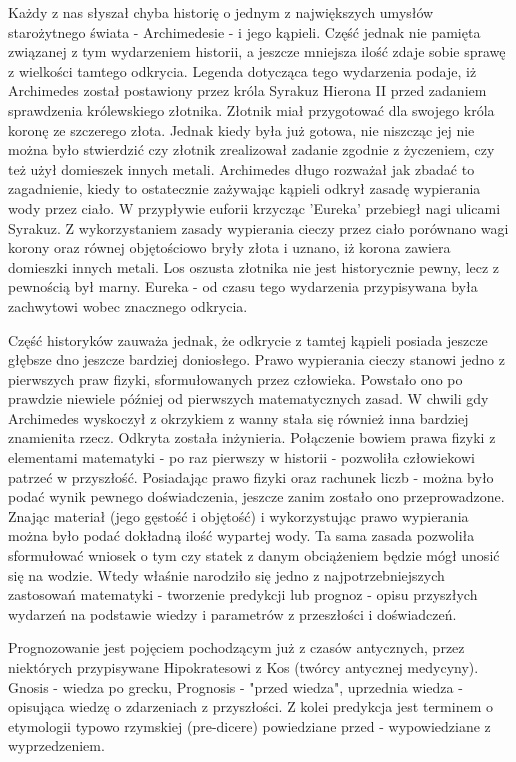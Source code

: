 \documentclass[10pt,a4paper]{book}
\begin{document}
Każdy z nas słyszał chyba historię o jednym z największych umysłów starożytnego świata - Archimedesie - i jego kąpieli. Część jednak nie pamięta związanej z tym wydarzeniem historii, a jeszcze mniejsza ilość zdaje sobie sprawę z wielkości tamtego odkrycia. Legenda dotycząca tego wydarzenia podaje, iż Archimedes został postawiony przez króla Syrakuz Hierona II przed zadaniem sprawdzenia królewskiego złotnika. Złotnik miał przygotować dla swojego króla koronę ze szczerego złota. Jednak kiedy była już gotowa, nie niszcząc jej nie można było stwierdzić czy złotnik zrealizował zadanie zgodnie z życzeniem, czy też użył domieszek innych metali. Archimedes długo rozważał jak zbadać to zagadnienie, kiedy to ostatecznie zażywając kąpieli odkrył zasadę wypierania wody przez ciało. W przypływie euforii krzycząc 'Eureka' przebiegł nagi ulicami Syrakuz. Z wykorzystaniem zasady wypierania cieczy przez ciało porównano wagi korony oraz równej objętościowo bryły złota i uznano, iż korona zawiera domieszki innych metali. Los oszusta złotnika nie jest historycznie pewny, lecz z pewnością był marny. Eureka - od czasu tego wydarzenia przypisywana była zachwytowi wobec znacznego odkrycia. 

Część historyków\citep{netz2007kodeks} zauważa jednak, że odkrycie z tamtej kąpieli posiada jeszcze głębsze dno jeszcze bardziej doniosłego. Prawo wypierania cieczy stanowi jedno z pierwszych praw fizyki, sformułowanych przez człowieka. Powstało ono po prawdzie niewiele później od pierwszych matematycznych zasad. W chwili gdy Archimedes wyskoczył z okrzykiem z wanny stała się również inna bardziej znamienita rzecz. Odkryta została inżynieria. Połączenie bowiem prawa fizyki z elementami matematyki - po raz pierwszy w historii - pozwoliła człowiekowi patrzeć w przyszłość. Posiadając prawo fizyki oraz rachunek liczb - można było podać wynik pewnego doświadczenia, jeszcze zanim zostało ono przeprowadzone. Znając materiał (jego gęstość i objętość) i wykorzystując prawo wypierania można było podać dokładną ilość wypartej wody. Ta sama zasada pozwoliła sformułować wniosek o tym czy statek z danym obciążeniem będzie mógł unosić się na wodzie. Wtedy właśnie narodziło się jedno z najpotrzebniejszych zastosowań matematyki - tworzenie predykcji lub prognoz - opisu przyszłych wydarzeń na podstawie wiedzy i parametrów z przeszłości i doświadczeń.  

Prognozowanie jest pojęciem pochodzącym już z czasów antycznych, przez niektórych przypisywane Hipokratesowi z Kos (twórcy antycznej medycyny). Gnosis - wiedza po grecku, Prognosis - "przed wiedza", uprzednia wiedza - opisująca wiedzę o zdarzeniach z przyszłości. Z kolei predykcja jest terminem o etymologii typowo rzymskiej (pre-dicere) powiedziane przed - wypowiedziane z wyprzedzeniem.
\end{document}
